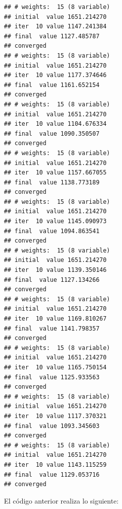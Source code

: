 \documentclass[
  spanish,
  12pt,
]{book}
\begin{document}
\begin{verbatim}
## # weights:  15 (8 variable)
## initial  value 1651.214270 
## iter  10 value 1147.241384
## final  value 1127.485787 
## converged
## # weights:  15 (8 variable)
## initial  value 1651.214270 
## iter  10 value 1177.374646
## final  value 1161.652154 
## converged
## # weights:  15 (8 variable)
## initial  value 1651.214270 
## iter  10 value 1104.676334
## final  value 1090.350507 
## converged
## # weights:  15 (8 variable)
## initial  value 1651.214270 
## iter  10 value 1157.667055
## final  value 1138.773189 
## converged
## # weights:  15 (8 variable)
## initial  value 1651.214270 
## iter  10 value 1145.090973
## final  value 1094.863541 
## converged
## # weights:  15 (8 variable)
## initial  value 1651.214270 
## iter  10 value 1139.350146
## final  value 1127.134266 
## converged
## # weights:  15 (8 variable)
## initial  value 1651.214270 
## iter  10 value 1169.810267
## final  value 1141.798357 
## converged
## # weights:  15 (8 variable)
## initial  value 1651.214270 
## iter  10 value 1165.750154
## final  value 1125.933563 
## converged
## # weights:  15 (8 variable)
## initial  value 1651.214270 
## iter  10 value 1117.370321
## final  value 1093.345603 
## converged
## # weights:  15 (8 variable)
## initial  value 1651.214270 
## iter  10 value 1143.115259
## final  value 1129.053716 
## converged
\end{verbatim}

El código anterior realiza lo siguiente:
\end{document}
